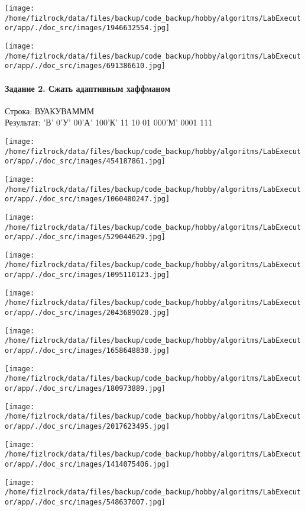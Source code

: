 \documentclass[a4paper, 12pt]{article}
\begin{document}
\texttt{[image: /home/fizlrock/data/files/backup/code\_backup/hobby/algoritms/LabExecutor/app/./doc\_src/images/1946632554.jpg]}

\texttt{[image: /home/fizlrock/data/files/backup/code\_backup/hobby/algoritms/LabExecutor/app/./doc\_src/images/691386610.jpg]}
\pagebreak
\paragraph{Задание 2. Сжать адаптивным хаффманом\\}

Строка: 
ВУАКУВАМММ\\
Результат: 'В' 0'У' 00'А' 100'К' 11 10 01 000'М' 0001 111

\texttt{[image: /home/fizlrock/data/files/backup/code\_backup/hobby/algoritms/LabExecutor/app/./doc\_src/images/454187861.jpg]}

\texttt{[image: /home/fizlrock/data/files/backup/code\_backup/hobby/algoritms/LabExecutor/app/./doc\_src/images/1060480247.jpg]}

\texttt{[image: /home/fizlrock/data/files/backup/code\_backup/hobby/algoritms/LabExecutor/app/./doc\_src/images/529044629.jpg]}

\texttt{[image: /home/fizlrock/data/files/backup/code\_backup/hobby/algoritms/LabExecutor/app/./doc\_src/images/1095110123.jpg]}

\texttt{[image: /home/fizlrock/data/files/backup/code\_backup/hobby/algoritms/LabExecutor/app/./doc\_src/images/2043689020.jpg]}

\texttt{[image: /home/fizlrock/data/files/backup/code\_backup/hobby/algoritms/LabExecutor/app/./doc\_src/images/1658648830.jpg]}

\texttt{[image: /home/fizlrock/data/files/backup/code\_backup/hobby/algoritms/LabExecutor/app/./doc\_src/images/180973889.jpg]}

\texttt{[image: /home/fizlrock/data/files/backup/code\_backup/hobby/algoritms/LabExecutor/app/./doc\_src/images/2017623495.jpg]}

\texttt{[image: /home/fizlrock/data/files/backup/code\_backup/hobby/algoritms/LabExecutor/app/./doc\_src/images/1414075406.jpg]}

\texttt{[image: /home/fizlrock/data/files/backup/code\_backup/hobby/algoritms/LabExecutor/app/./doc\_src/images/548637007.jpg]}
\pagebreak
\end{document}
